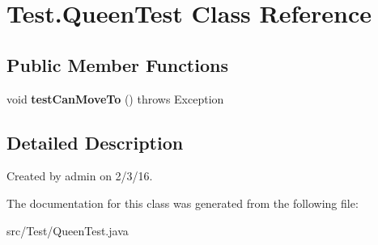 \hypertarget{class_test_1_1_queen_test}{}\section{Test.\+Queen\+Test Class Reference}
\label{class_test_1_1_queen_test}
\subsection*{Public Member Functions}
\begin{DoxyCompactItemize}
\item 
void {\bfseries test\+Can\+Move\+To} ()  throws Exception \hypertarget{class_test_1_1_queen_test_a6e8fd9cacc0e6d98aa5494489129be08}{}\label{class_test_1_1_queen_test_a6e8fd9cacc0e6d98aa5494489129be08}

\end{DoxyCompactItemize}


\subsection{Detailed Description}
Created by admin on 2/3/16. 

The documentation for this class was generated from the following file\+:\begin{DoxyCompactItemize}
\item 
src/\+Test/Queen\+Test.\+java\end{DoxyCompactItemize}
